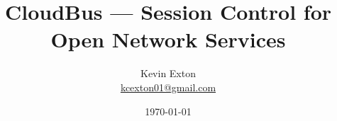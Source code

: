 \title{CloudBus --- Session Control for Open Network Services}
\author[K. Exton]{
	\centering
	Kevin Exton\\
	\href{mailto:kcexton01@gmail.com}{\footnotesize kcexton01@gmail.com}
}
\date{\today}
\begin{frame}[plain]
	\titlepage
	\centering
	\footnotesize 
\end{frame}